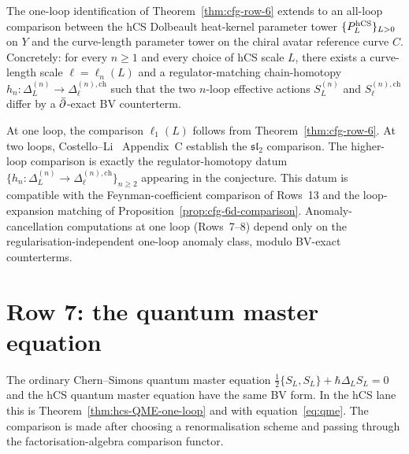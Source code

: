\begin{conjecture}
\label{conj:cfg-row-6-all-loop}
The one-loop identification of Theorem~\ref{thm:cfg-row-6} extends to
an all-loop comparison between the hCS Dolbeault heat-kernel parameter
tower $\{P_L^{\mathrm{hCS}}\}_{L>0}$ on $Y$ and the curve-length parameter
tower on the chiral avatar reference curve $C$. Concretely: for every
$n\geq 1$ and every choice of hCS scale $L$, there exists a curve-length scale
$\ell = \ell_n(L)$ and a regulator-matching chain-homotopy
$h_n\colon\Delta_L^{(n)}\to\Delta_\ell^{(n),\mathrm{ch}}$ such that
the two $n$-loop effective actions $S_L^{(n)}$ and $S_\ell^{(n),\mathrm{ch}}$
differ by a $\bar\partial$-exact BV counterterm.
\end{conjecture}

\begin{remark}
\label{rem:cfg-row-6-scope}
At one loop, the comparison $\ell_1(L)$ follows from
Theorem~\ref{thm:cfg-row-6}. At two loops,
Costello--Li~\cite{CL16} Appendix~C establish the
$\mathfrak{sl}_2$ comparison. The higher-loop comparison is exactly
the regulator-homotopy datum
$\{h_n\colon\Delta_L^{(n)}\to\Delta_\ell^{(n),\mathrm{ch}}\}_{n\ge 2}$
appearing in the conjecture. This datum is compatible with the
Feynman-coefficient comparison of Rows~13 and the loop-expansion matching of
Proposition~\ref{prop:cfg-6d-comparison}. Anomaly-cancellation
computations at one loop (Rows~7--8) depend only on the
regularisation-independent one-loop anomaly class, modulo BV-exact
counterterms.
\end{remark}

\section{Row 7: the quantum master equation}
\label{sec:cfg-row-7-qme}

\begin{theorem}
\label{thm:cfg-row-7}
The ordinary Chern--Simons quantum master equation
$\tfrac12\{S_L,S_L\} + \hbar\Delta_L S_L = 0$ and the hCS quantum master
equation have the same BV form. In the hCS lane this is
Theorem~\ref{thm:hcs-QME-one-loop} and with
equation~\eqref{eq:qme}. The comparison is made after choosing a
renormalisation scheme and passing through the factorisation-algebra
comparison functor.
\end{theorem}

